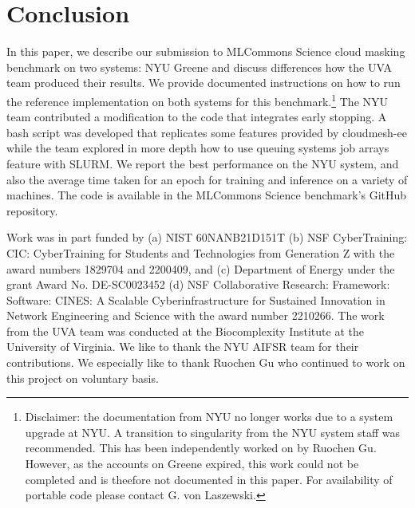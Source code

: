 \documentclass[sigplan,screen]{acmart}
\begin{document}
\section{Conclusion}

In this paper, we describe our submission to MLCommons Science cloud masking benchmark on two systems: NYU Greene and discuss differences how the UVA team produced their results. We provide documented instructions on how to run the reference implementation on both systems for this benchmark.\footnote{Disclaimer: the documentation from NYU no longer works due to a system upgrade at NYU. A transition to singularity from the NYU system staff was recommended. This has been independently worked on by Ruochen Gu. However, as the accounts on Greene expired, this work could not be completed and is theefore not documented in this paper. For availability of portable code please contact G. von Laszewski.} 
The NYU team contributed a modification to the code that integrates early stopping. A bash script was developed that replicates some features provided by cloudmesh-ee while the team explored in more depth how to use queuing systems job arrays feature with SLURM. We report the best performance on the NYU system, and also the average time taken for an epoch for training and inference on a variety of machines. The code is available in the MLCommons Science benchmark's GitHub repository.



\begin{acks}

  Work was in part funded by (a) NIST 60NANB21D151T (b) NSF
  CyberTraining: CIC: CyberTraining for Students and Technologies from
  Generation Z with the award numbers 1829704 and 2200409, and (c)
  Department of Energy under the grant Award No. DE-SC0023452 (d) NSF
  Collaborative Research: Framework: Software: CINES: A Scalable
  Cyberinfrastructure for Sustained Innovation in Network Engineering
  and Science with the award number 2210266. The work from the UVA
  team was conducted at the Biocomplexity Institute at
  the University of Virginia.  We like to thank the NYU AIFSR team for
  their contributions. We especially like to thank Ruochen Gu who
  continued to work on this project on voluntary basis.

\end{acks}



\end{document}
